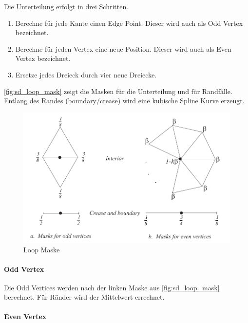 Die Unterteilung erfolgt in drei Schritten.
\begin{enumerate}
\item Berechne für jede Kante einen Edge Point. Dieser wird auch als Odd Vertex bezeichnet.
\item Berechne für jeden Vertex eine neue Position. Dieser wird auch als Even Vertex bezeichnet.
\item Ersetze jedes Dreieck durch vier neue Dreiecke.
\end{enumerate}

\autoref{fig:sd_loop_mask} zeigt die Masken für die Unterteilung
und für Randfälle.
Entlang des Randes (boundary/crease) wird eine kubische Spline Kurve erzeugt.
\cite[S. 70]{Zorin.subdivcourse}
\begin{figure}
\centering
\includegraphics[width=1.0\textwidth]{content/media/sd_loop_mask.jpg}
\caption{Loop Maske \cite[S. 70 f.]{Zorin.subdivcourse}}
\label{fig:sd_loop_mask}
\end{figure}

\paragraph*{Odd Vertex}
Die Odd Vertices werden nach der linken Maske aus \autoref{fig:sd_loop_mask} berechnet.
Für Ränder wird der Mittelwert errechnet.

\paragraph*{Even Vertex}

